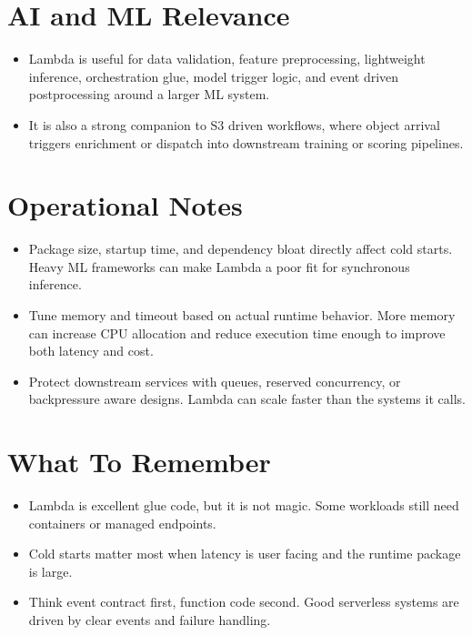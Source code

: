 \documentclass[10pt,twocolumn]{article}
\begin{document}
\section*{AI and ML Relevance}
\begin{itemize}
\item Lambda is useful for data validation, feature preprocessing, lightweight inference, orchestration glue, model trigger logic, and event driven postprocessing around a larger ML system.
\item It is also a strong companion to S3 driven workflows, where object arrival triggers enrichment or dispatch into downstream training or scoring pipelines.
\end{itemize}

\section*{Operational Notes}
\begin{itemize}
\item Package size, startup time, and dependency bloat directly affect cold starts. Heavy ML frameworks can make Lambda a poor fit for synchronous inference.
\item Tune memory and timeout based on actual runtime behavior. More memory can increase CPU allocation and reduce execution time enough to improve both latency and cost.
\item Protect downstream services with queues, reserved concurrency, or backpressure aware designs. Lambda can scale faster than the systems it calls.
\end{itemize}

\section*{What To Remember}
\begin{itemize}
\item Lambda is excellent glue code, but it is not magic. Some workloads still need containers or managed endpoints.
\item Cold starts matter most when latency is user facing and the runtime package is large.
\item Think event contract first, function code second. Good serverless systems are driven by clear events and failure handling.
\end{itemize}
\end{document}
